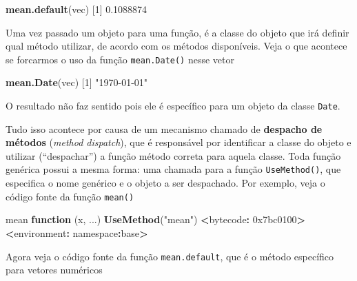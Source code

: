 \documentclass[10pt,a4paper]{book}
\newenvironment{Shaded}{\begin{snugshade}}{\end{snugshade}}
\newcommand{\KeywordTok}[1]{\textcolor[rgb]{0.13,0.29,0.53}{\textbf{#1}}}
\newcommand{\DecValTok}[1]{\textcolor[rgb]{0.00,0.00,0.81}{#1}}
\newcommand{\FloatTok}[1]{\textcolor[rgb]{0.00,0.00,0.81}{#1}}
\newcommand{\StringTok}[1]{\textcolor[rgb]{0.31,0.60,0.02}{#1}}
\newcommand{\ControlFlowTok}[1]{\textcolor[rgb]{0.13,0.29,0.53}{\textbf{#1}}}
\newcommand{\OperatorTok}[1]{\textcolor[rgb]{0.81,0.36,0.00}{\textbf{#1}}}
\newcommand{\ErrorTok}[1]{\textcolor[rgb]{0.64,0.00,0.00}{\textbf{#1}}}
\newcommand{\NormalTok}[1]{#1}
\begin{document}
\begin{Shaded}
\begin{Highlighting}[]
\KeywordTok{mean.default}\NormalTok{(vec)}
\NormalTok{[}\DecValTok{1}\NormalTok{] }\FloatTok{0.1088874}
\end{Highlighting}
\end{Shaded}

Uma vez passado um objeto para uma função, é a classe do objeto que irá
definir qual método utilizar, de acordo com os métodos disponíveis. Veja
o que acontece se forcarmos o uso da função \texttt{mean.Date()} nesse
vetor

\begin{Shaded}
\begin{Highlighting}[]
\KeywordTok{mean.Date}\NormalTok{(vec)}
\NormalTok{[}\DecValTok{1}\NormalTok{] }\StringTok{"1970-01-01"}
\end{Highlighting}
\end{Shaded}

O resultado não faz sentido pois ele é específico para um objeto da
classe \texttt{Date}.

Tudo isso acontece por causa de um mecanismo chamado de \textbf{despacho
de métodos} (\emph{method dispatch}), que é responsável por identificar
a classe do objeto e utilizar (``despachar'') a função método correta
para aquela classe. Toda função genérica possui a mesma forma: uma
chamada para a função \texttt{UseMethod()}, que especifica o nome
genérico e o objeto a ser despachado. Por exemplo, veja o código fonte
da função \texttt{mean()}

\begin{Shaded}
\begin{Highlighting}[]
\NormalTok{mean}
\ControlFlowTok{function}\NormalTok{ (x, ...) }
\KeywordTok{UseMethod}\NormalTok{(}\StringTok{"mean"}\NormalTok{)}
\OperatorTok{<}\NormalTok{bytecode}\OperatorTok{:}\StringTok{ }\DecValTok{0x7bc0100}\OperatorTok{>}
\ErrorTok{<}\NormalTok{environment}\OperatorTok{:}\StringTok{ }\NormalTok{namespace}\OperatorTok{:}\NormalTok{base}\OperatorTok{>}
\end{Highlighting}
\end{Shaded}

Agora veja o código fonte da função \texttt{mean.default}, que é o
método específico para vetores numéricos
\end{document}
